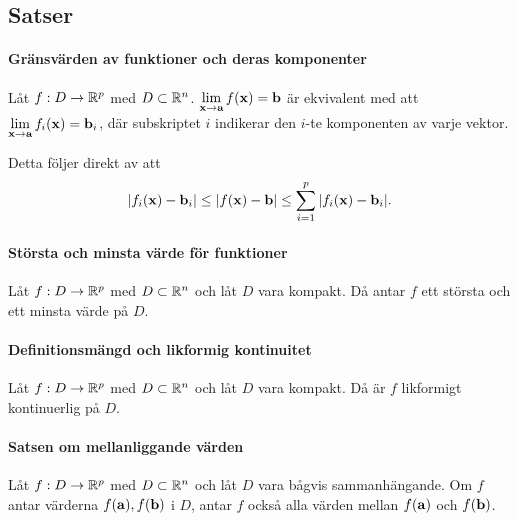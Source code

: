 \subsection{Satser}

\paragraph{Gränsvärden av funktioner och deras komponenter}
Låt $f: D\to\mathbb{R}^p$ med $D\subset\mathbb{R}^n$. $\limit{\vect{x}}{\vect{a}}f(\vect{x}) = \vect{b}$ är ekvivalent med att $\limit{\vect{x}}{\vect{a}}f_i(\vect{x}) = \vect{b}_i$, där subskriptet $i$ indikerar den $i$-te komponenten av varje vektor.

\proof
Detta följer direkt av att
\begin{align*}
	\abs{f_i(\vect{x}) - \vect{b}_i}\leq\abs{f(\vect{x}) - \vect{b}}\leq\sum\limits_{i = 1}^{p}\abs{f_i(\vect{x}) - \vect{b}_i}.
\end{align*}

\paragraph{Största och minsta värde för funktioner}
Låt $f: D\to\mathbb{R}^p$ med $D\subset\mathbb{R}^n$ och låt $D$ vara kompakt. Då antar $f$ ett största och ett minsta värde på $D$.

\proof

\paragraph{Definitionsmängd och likformig kontinuitet}
Låt $f: D\to\mathbb{R}^p$ med $D\subset\mathbb{R}^n$ och låt $D$ vara kompakt. Då är $f$ likformigt kontinuerlig på $D$.

\proof

\paragraph{Satsen om mellanliggande värden}
Låt $f: D\to\mathbb{R}^p$ med $D\subset\mathbb{R}^n$ och låt $D$ vara bågvis sammanhängande. Om $f$ antar värderna $f(\vect{a}), f(\vect{b})$ i $D$, antar $f$ också alla värden mellan $f(\vect{a})$ och $f(\vect{b})$.

\proof